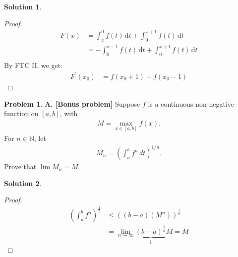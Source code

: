 \documentclass[12pt]{article}
\theoremstyle{definition} %
\newtheorem{solution}{Solution}
\newtheorem{problem}{Problem}
\theoremstyle{plain} %
\begin{document}
\begin{solution}
    \begin{proof}
        \begin{align}
            F(x) &= \int_{x}^{0} f(t) \,\mathrm{d}t + \int_{0}^{x+1} f(t) \,\mathrm{d}t \\[10pt] 
            &= -\int_{0}^{x-1} f(t) \,\mathrm{d}t + \int_{0}^{x+1} f(t) \,\mathrm{d}t \\[10pt] 
        \end{align}
        By FTC II, we get:
        \begin{align}
            F^\prime (x_0) &= f(x_{0}+1) - f(x_{0}-1) 
        \end{align}
    \end{proof}
\end{solution}
\begin{problem}
    \noindent \textbf{A. [Bonus problem]} Suppose $ f $ is a continuous non-negative function on $[a, b]$, with 
\begin{align}
M = \max_{x \in [a, b]} f(x).
\end{align}
For $ n \in \mathbb{N} $, let
\begin{align} 
M_n = \left( \int_a^b f^n \, dt \right)^{1/n}.
\end{align}
Prove that $ \lim M_n = M $.
\end{problem}
\begin{solution}
   \begin{proof}
    \begin{align}
        \left( \int_{a}^{b} f^{n}  \right)^{\frac{1}{n}} &\leq \left( (b-a)(M^{n}) \right)^{\frac{1}{n}} \\[10pt] 
        &= \lim_{n \to \infty} \underbrace{(b-a)^{\frac{1}{n}}}_{1} M = M 
    \end{align}
   \end{proof} 
\end{solution}
\end{document}
